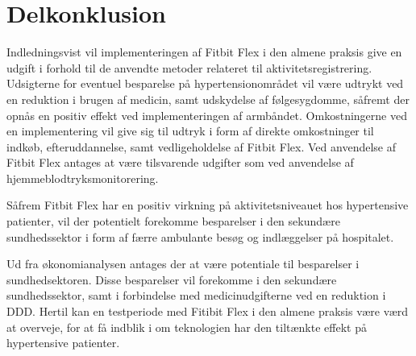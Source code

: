 \section{Delkonklusion}


Indledningsvist vil implementeringen af Fitbit Flex i den almene praksis give en udgift i forhold til de anvendte metoder relateret til aktivitetsregistrering. Udsigterne for eventuel besparelse på hypertensionområdet vil være udtrykt ved en reduktion i brugen af medicin, samt udskydelse af følgesygdomme, såfremt der opnås en positiv effekt ved implementeringen af armbåndet. Omkostningerne ved en implementering vil give sig til udtryk i form af direkte omkostninger til indkøb, efteruddannelse, samt vedligeholdelse af Fitbit Flex. Ved anvendelse af Fitbit Flex antages at være tilsvarende udgifter som ved anvendelse af hjemmeblodtryksmonitorering. 

Såfrem Fitbit Flex har en positiv virkning på aktivitetsniveauet hos hypertensive patienter, vil der potentielt forekomme besparelser i den sekundære sundhedssektor i form af færre ambulante besøg og indlæggelser på hospitalet.

Ud fra økonomianalysen antages der at være potentiale til besparelser i sundhedsektoren. Disse besparelser vil forekomme i den sekundære sundhedssektor, samt i forbindelse med medicinudgifterne ved en reduktion i DDD. Hertil kan en testperiode med Fitibit Flex i den almene praksis være værd at overveje, for at få indblik i om teknologien har den tiltænkte effekt på hypertensive patienter.  